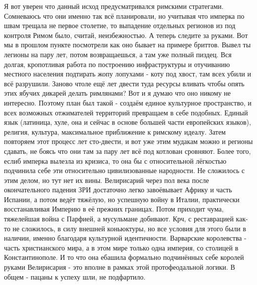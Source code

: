 Я вот уверен что данный исход предусматривался римскими стратегами. Сомневаюсь что они именно так всё планировали, но учитывая что имперка по швам трещала не первое столетие, то выпадение отдельных регионов из под контроля Римом было, считай, неизбежностью. А теперь следите за руками. Вот мы в прошлом пункте посмотрели как оно бывает на примере бриттов. Вывел ты легионы на пару лет, потом возвращаешься, а там уже полный пиздец. Вся долгая, кропотливая работа по построению инфраструктуры и отучиванию местного населения подтирать жопу лопухами - коту под хвост, там всех убили и всё разрушили. Заново чтоле ещё лет двести туда ресурсы вливать чтобы опять этих ябучих дикарей делать римлянами? Вот и я думаю что оно никому не интересно. Поэтому план был такой - создаём единое культурное пространство, и всех возможных отжимателей территорий превращаем в себе подобных. Единый язык (латиница, хуле, она и сейчас в основе большей части европейских языков), религия, культура, максимальное приближение к римскому идеалу. Затем повторяем этот процесс лет сто-двести, и вот уже этим мудакам можно и регионы сдавать, не боясь что они там за пару лет всё под котлован сровняют. Более того, еслиб имперка вылезла из кризиса, то она бы с относительной лёгкостью подчинила себе эти относительно цивилизованные народности. Не сложилось с этим делом, но тут нет их вины. Велирисарий через пол века после окончательного падения ЗРИ достаточно легко завоёвывает Африку и часть Испании, а потом ведёт тяжёлую, но успешную войну в Италии, практически восстанавливая Империю в её прежних границах. Потом приходит чума, тяжелейшая война с Парфией, а мусульмане добивают. Крч, с реставрацией как-то не сложилось, в силу внешней коньюктуры, но все условия для этого были в наличии, именно благодаря культурной идентичности. Варварские королевства - часть христианского мира, а в этом мире только одна империя, со столицей в Константинополе. И то что она ебашила формально подчинённых себе королей руками Велирисария - это вполне в рамках этой протофеодальной логики. В общем - пацаны к успеху шли, не подфартило. 

